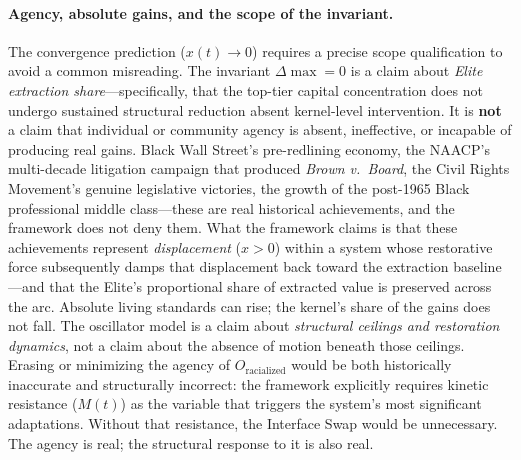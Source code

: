 \paragraph{Agency, absolute gains, and the scope of the invariant.}
The convergence prediction ($x(t) \rightarrow 0$) requires a precise scope qualification to avoid a common misreading. The invariant $\Delta\max = 0$ is a claim about \textit{Elite extraction share}---specifically, that the top-tier capital concentration does not undergo sustained structural reduction absent kernel-level intervention. It is \textbf{not} a claim that individual or community agency is absent, ineffective, or incapable of producing real gains. Black Wall Street's pre-redlining economy, the NAACP's multi-decade litigation campaign that produced \textit{Brown v.\ Board}, the Civil Rights Movement's genuine legislative victories, the growth of the post-1965 Black professional middle class---these are real historical achievements, and the framework does not deny them. What the framework claims is that these achievements represent \textit{displacement} ($x > 0$) within a system whose restorative force subsequently damps that displacement back toward the extraction baseline---and that the Elite's proportional share of extracted value is preserved across the arc. Absolute living standards can rise; the kernel's share of the gains does not fall. The oscillator model is a claim about \textit{structural ceilings and restoration dynamics}, not a claim about the absence of motion beneath those ceilings. Erasing or minimizing the agency of $O_{\text{racialized}}$ would be both historically inaccurate and structurally incorrect: the framework explicitly requires kinetic resistance ($M(t)$) as the variable that triggers the system's most significant adaptations. Without that resistance, the Interface Swap would be unnecessary. The agency is real; the structural response to it is also real.

